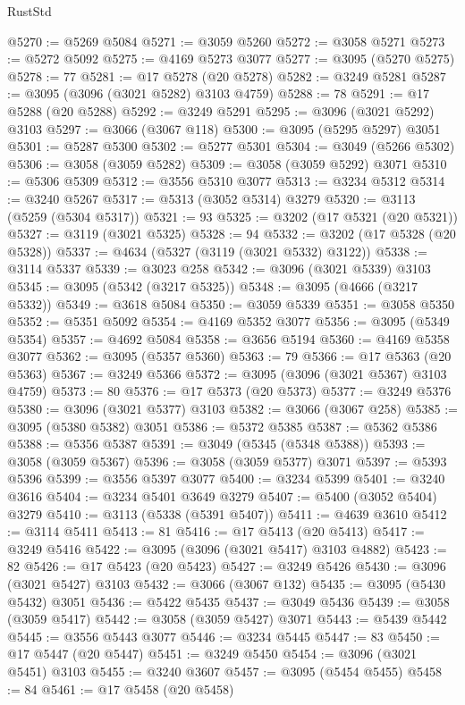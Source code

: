 \begin{lexlean}{RustStd}
\begin{coremodule}
@5270 := @5269 @5084
@5271 := @3059 @5260
@5272 := @3058 @5271
@5273 := @5272 @5092
@5275 := @4169 @5273 @3077
@5277 := @3095 (@5270 @5275)
@5278 := 77
@5281 := @17 @5278 (@20 @5278)
@5282 := @3249 @5281
@5287 := @3095 (@3096 (@3021 @5282) @3103 @4759)
@5288 := 78
@5291 := @17 @5288 (@20 @5288)
@5292 := @3249 @5291
@5295 := @3096 (@3021 @5292) @3103
@5297 := @3066 (@3067 @118)
@5300 := @3095 (@5295 @5297) @3051
@5301 := @5287 @5300
@5302 := @5277 @5301
@5304 := @3049 (@5266 @5302)
@5306 := @3058 (@3059 @5282)
@5309 := @3058 (@3059 @5292) @3071
@5310 := @5306 @5309
@5312 := @3556 @5310 @3077
@5313 := @3234 @5312
@5314 := @3240 @5267
@5317 := @5313 (@3052 @5314) @3279
@5320 := @3113 (@5259 (@5304 @5317))
@5321 := 93
@5325 := @3202 (@17 @5321 (@20 @5321))
@5327 := @3119 (@3021 @5325)
@5328 := 94
@5332 := @3202 (@17 @5328 (@20 @5328))
@5337 := @4634 (@5327 (@3119 (@3021 @5332) @3122))
@5338 := @3114 @5337
@5339 := @3023 @258
@5342 := @3096 (@3021 @5339) @3103
@5345 := @3095 (@5342 (@3217 @5325))
@5348 := @3095 (@4666 (@3217 @5332))
@5349 := @3618 @5084
@5350 := @3059 @5339
@5351 := @3058 @5350
@5352 := @5351 @5092
@5354 := @4169 @5352 @3077
@5356 := @3095 (@5349 @5354)
@5357 := @4692 @5084
@5358 := @3656 @5194
@5360 := @4169 @5358 @3077
@5362 := @3095 (@5357 @5360)
@5363 := 79
@5366 := @17 @5363 (@20 @5363)
@5367 := @3249 @5366
@5372 := @3095 (@3096 (@3021 @5367) @3103 @4759)
@5373 := 80
@5376 := @17 @5373 (@20 @5373)
@5377 := @3249 @5376
@5380 := @3096 (@3021 @5377) @3103
@5382 := @3066 (@3067 @258)
@5385 := @3095 (@5380 @5382) @3051
@5386 := @5372 @5385
@5387 := @5362 @5386
@5388 := @5356 @5387
@5391 := @3049 (@5345 (@5348 @5388))
@5393 := @3058 (@3059 @5367)
@5396 := @3058 (@3059 @5377) @3071
@5397 := @5393 @5396
@5399 := @3556 @5397 @3077
@5400 := @3234 @5399
@5401 := @3240 @3616
@5404 := @3234 @5401 @3649 @3279
@5407 := @5400 (@3052 @5404) @3279
@5410 := @3113 (@5338 (@5391 @5407))
@5411 := @4639 @3610
@5412 := @3114 @5411
@5413 := 81
@5416 := @17 @5413 (@20 @5413)
@5417 := @3249 @5416
@5422 := @3095 (@3096 (@3021 @5417) @3103 @4882)
@5423 := 82
@5426 := @17 @5423 (@20 @5423)
@5427 := @3249 @5426
@5430 := @3096 (@3021 @5427) @3103
@5432 := @3066 (@3067 @132)
@5435 := @3095 (@5430 @5432) @3051
@5436 := @5422 @5435
@5437 := @3049 @5436
@5439 := @3058 (@3059 @5417)
@5442 := @3058 (@3059 @5427) @3071
@5443 := @5439 @5442
@5445 := @3556 @5443 @3077
@5446 := @3234 @5445
@5447 := 83
@5450 := @17 @5447 (@20 @5447)
@5451 := @3249 @5450
@5454 := @3096 (@3021 @5451) @3103
@5455 := @3240 @3607
@5457 := @3095 (@5454 @5455)
@5458 := 84
@5461 := @17 @5458 (@20 @5458)

\end{coremodule}
\end{lexlean}
